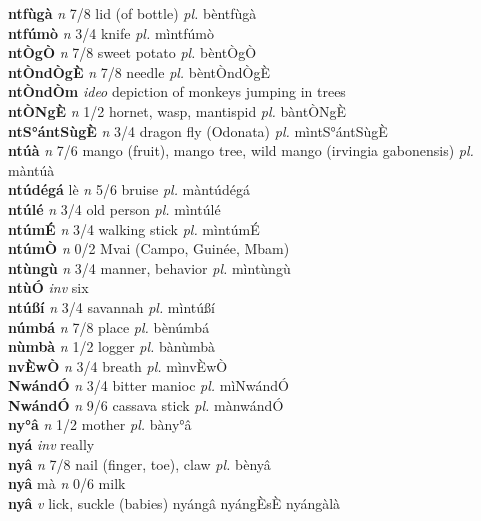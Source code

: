 \documentclass{article}
\begin{document}
{\bf ntfùgà}  {\it n} 7/8 lid (of bottle) {\it pl.} bèntfùgà         \\ 
{\bf ntfúmò}  {\it n} 3/4 knife {\it pl.} mìntfúmò         \\ 
{\bf ntÒgÒ}  {\it n} 7/8 sweet potato {\it pl.} bèntÒgÒ         \\ 
{\bf ntÒndÒgÈ}  {\it n} 7/8 needle {\it pl.} bèntÒndÒgÈ         \\ 
{\bf ntÒndÒm}  {\it ideo} depiction of monkeys jumping in trees         \\ 
{\bf ntÒNgÈ}  {\it n} 1/2 hornet, wasp, mantispid {\it pl.} bàntÒNgÈ         \\ 
{\bf ntS°ántSùgÈ}  {\it n} 3/4 dragon fly (Odonata) {\it pl.} mìntS°ántSùgÈ         \\ 
{\bf ntúà}  {\it n} 7/6 mango (fruit),  mango tree, wild mango (irvingia gabonensis) {\it pl.} màntúà         \\ 
{\bf ntúdégá} lè {\it n} 5/6 bruise {\it pl.} màntúdégá         \\ 
{\bf ntúlé}  {\it n} 3/4 old person {\it pl.} mìntúlé         \\ 
{\bf ntúmÉ}  {\it n} 3/4 walking stick {\it pl.} mìntúmÉ         \\ 
{\bf ntúmÒ}  {\it n} 0/2 Mvai (Campo, Guinée, Mbam)         \\ 
{\bf ntùngù}  {\it n} 3/4 manner, behavior {\it pl.} mìntùngù         \\ 
{\bf ntùÓ}  {\it inv} six         \\ 
{\bf ntúßí}  {\it n} 3/4 savannah {\it pl.} mìntúßí         \\ 
{\bf númbá}  {\it n} 7/8 place {\it pl.} bènúmbá         \\ 
{\bf nùmbà}  {\it n} 1/2 logger {\it pl.} bànùmbà         \\ 
{\bf nvÈwÒ}  {\it n} 3/4 breath {\it pl.} mìnvÈwÒ         \\ 
{\bf NwándÓ}  {\it n} 3/4 bitter manioc {\it pl.} mìNwándÓ         \\ 
{\bf NwándÓ}  {\it n} 9/6 cassava stick {\it pl.} mànwándÓ         \\ 
{\bf ny°â}  {\it n} 1/2 mother {\it pl.} bàny°â         \\ 
{\bf nyá}  {\it inv} really         \\ 
{\bf nyâ}  {\it n} 7/8 nail (finger, toe), claw {\it pl.} bènyâ         \\ 
{\bf nyâ} mà {\it n} 0/6 milk         \\ 
{\bf nyâ}  {\it v} lick, suckle (babies)   nyángâ  nyángÈsÈ nyángàlà   \\ 
\end{document}
